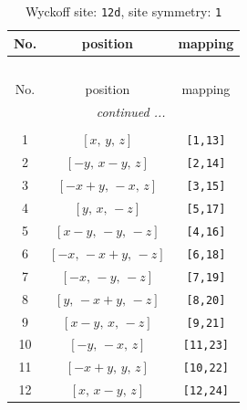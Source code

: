 \documentclass[fleqn,8pt]{jsarticle}
\begin{document}
\renewcommand{\arraystretch}{1.2}
\begin{longtable}{ccc}
\caption{Wyckoff site: {\tt 12d}, site symmetry: {\tt 1}}
 \\
 \hline \hline
No. & position & mapping \\ \hline \endfirsthead

\multicolumn{2}{l}{\tablename\ \thetable{}} \\
 \hline \hline
No. & position & mapping \\ \hline \endhead

 \hline \hline
\multicolumn{2}{r}{\footnotesize\it continued ...} \\ \endfoot

 \hline \hline
\multicolumn{2}{r}{} \\ \endlastfoot

1 & $\left[ x,\, y,\, z \right]$ & {\tt [1,13]} \\ \hline
2 & $\left[ - y,\, x - y,\, z \right]$ & {\tt [2,14]} \\ \hline
3 & $\left[ - x + y,\, - x,\, z \right]$ & {\tt [3,15]} \\ \hline
4 & $\left[ y,\, x,\, - z \right]$ & {\tt [5,17]} \\ \hline
5 & $\left[ x - y,\, - y,\, - z \right]$ & {\tt [4,16]} \\ \hline
6 & $\left[ - x,\, - x + y,\, - z \right]$ & {\tt [6,18]} \\ \hline
7 & $\left[ - x,\, - y,\, - z \right]$ & {\tt [7,19]} \\ \hline
8 & $\left[ y,\, - x + y,\, - z \right]$ & {\tt [8,20]} \\ \hline
9 & $\left[ x - y,\, x,\, - z \right]$ & {\tt [9,21]} \\ \hline
10 & $\left[ - y,\, - x,\, z \right]$ & {\tt [11,23]} \\ \hline
11 & $\left[ - x + y,\, y,\, z \right]$ & {\tt [10,22]} \\ \hline
12 & $\left[ x,\, x - y,\, z \right]$ & {\tt [12,24]} \\
\end{longtable}
\end{document}
